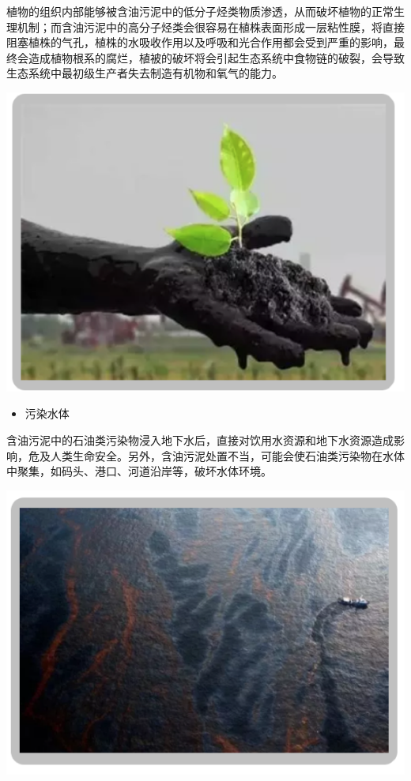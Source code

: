\documentclass[]{book}
\providecommand{\tightlist}{%
  \setlength{\itemsep}{0pt}\setlength{\parskip}{0pt}}
\begin{document}
植物的组织内部能够被含油污泥中的低分子烃类物质渗透，从而破坏植物的正常生理机制；而含油污泥中的高分子烃类会很容易在植株表面形成一层粘性膜，将直接阻塞植株的气孔，植株的水吸收作用以及呼吸和光合作用都会受到严重的影响，最终会造成植物根系的腐烂，植被的破坏将会引起生态系统中食物链的破裂，会导致生态系统中最初级生产者失去制造有机物和氧气的能力。

\includegraphics[width=8.33in]{images/youni5}

\begin{itemize}
\tightlist
\item
  污染水体
\end{itemize}

含油污泥中的石油类污染物浸入地下水后，直接对饮用水资源和地下水资源造成影响，危及人类生命安全。另外，含油污泥处置不当，可能会使石油类污染物在水体中聚集，如码头、港口、河道沿岸等，破坏水体环境。

\includegraphics[width=8.33in]{images/youni6}
\end{document}
